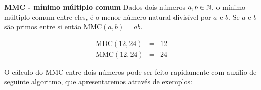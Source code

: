  \vskip0.3cm

 \colorbox{azul}{
 \begin{minipage}{0.9\linewidth}
 \begin{center}
 \textbf{MMC - mínimo múltiplo comum}
 Dados dois números $a, b \in \mathbb{N}$, o mínimo múltiplo comum entre eles, é o menor número natural divisível por $a$ e $b$. Se $a$ e $b$ são primos entre si então MMC$(a, b)= ab$.
 \end{center}
 \end{minipage}}


 \begin{exem}
 \begin{eqnarray}
  \text{MDC}(12, 24)&=& 12 \\
  \text{MMC}(12, 24)&=& 24
 \end{eqnarray}
  \end{exem}

 O cálculo do MMC entre dois números pode ser feito rapidamente com auxílio de seguinte algoritmo, que apresentaremos através de exemplos:

